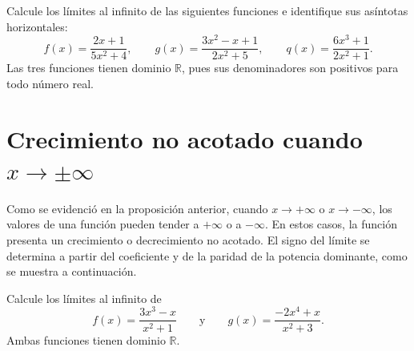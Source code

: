 \documentclass[10pt,a5paper]{article}
\newif\ifmostrarSoluciones
\begin{document}
\begin{ejemplo}
Calcule los límites al infinito de las siguientes funciones e identifique sus asíntotas horizontales:
\[
  f(x)=\frac{2x+1}{5x^2+4},
  \qquad
  g(x)=\frac{3x^2-x+1}{2x^2+5},
  \qquad
  q(x)=\frac{6x^3+1}{2x^2+1}.
\]
Las tres funciones tienen dominio $\mathbb{R}$, pues sus denominadores son positivos para todo número real.
\end{ejemplo}
\ifmostrarSoluciones
\begin{solucion}
En $f$, estudiar el límite equivale a estudiar el cociente de sus términos de mayor grado:
\[
  \lim_{x\to\pm\infty}f(x)
  =\lim_{x\to\pm\infty}\frac{2x}{5x^2}
  =\lim_{x\to\pm\infty}\frac{2}{5x}=0.
\]
Por tanto, $y=0$ es una asíntota horizontal. En $g$, el estudio del límite equivale al del cociente $3x^2/(2x^2)$:
\[
  \lim_{x\to\pm\infty}g(x)
  =\lim_{x\to\pm\infty}\frac{3x^2}{2x^2}
  =\frac{3}{2}.
\]
Así, $y=3/2$ es una asíntota horizontal. En $q$, tenemos la equivalencia asintótica
\[
  q(x)=\frac{6x^3+1}{2x^2+1}\sim\frac{6x^3}{2x^2}=3x
  \qquad (x\to\pm\infty).
\]
Por tanto,
\[
  \lim_{x\to+\infty}q(x)=\lim_{x\to+\infty}3x=+\infty,
\]
\[
  \lim_{x\to-\infty}q(x)=\lim_{x\to-\infty}3x=-\infty.
\]
Por tanto, $q$ no tiene asíntota horizontal.
\end{solucion}
\else\vspace{24mm}\fi

\section*{Crecimiento no acotado cuando $x\to\pm\infty$}

Como se evidenció en la proposición anterior, cuando $x\to+\infty$ o $x\to-\infty$, los valores de una función pueden tender a $+\infty$ o a $-\infty$. En estos casos, la función presenta un crecimiento o decrecimiento no acotado. El signo del límite se determina a partir del coeficiente y de la paridad de la potencia dominante, como se muestra a continuación.

\begin{ejemplo}
Calcule los límites al infinito de
\[
  f(x)=\frac{3x^3-x}{x^2+1}
  \qquad\text{y}\qquad
  g(x)=\frac{-2x^4+x}{x^2+3}.
\]
Ambas funciones tienen dominio $\mathbb{R}$.
\end{ejemplo}
\ifmostrarSoluciones
\begin{solucion}
La función $f$ se comporta como $3x$. Como la potencia dominante es impar y su coeficiente es positivo,
\[
  \lim_{x\to+\infty}f(x)=+\infty,
  \qquad
  \lim_{x\to-\infty}f(x)=-\infty.
\]
La función $g$ se comporta como $-2x^2$. La potencia dominante es par, por lo que $x^2$ es positivo en ambos extremos; el coeficiente negativo determina el signo final:
\[
  \lim_{x\to+\infty}g(x)=-\infty,
  \qquad
  \lim_{x\to-\infty}g(x)=-\infty.
\]
Ninguna de las dos funciones tiene asíntota horizontal.
\end{solucion}
\else\vspace{22mm}\fi
\end{document}
